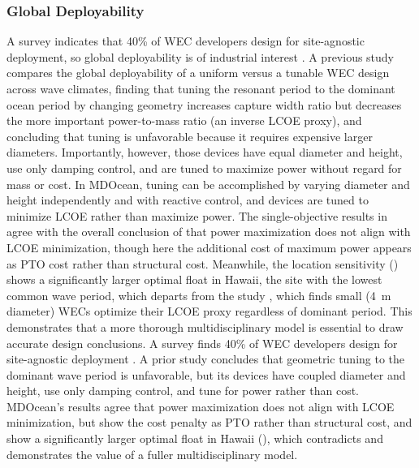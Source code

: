 \subsubsection{Global Deployability}
\ifdefined\DISSERTATION
    A survey indicates that 40\% of WEC developers design for site-agnostic deployment, so global deployability is of industrial interest \cite{trueworthy_wave_2020}.
    A previous study \cite{de_andres_adaptability_2015} compares the global deployability of a uniform versus a tunable WEC design across wave climates, finding that tuning the resonant period to the dominant ocean period by changing geometry increases capture width ratio but decreases the more important power-to-mass ratio (an inverse LCOE proxy), and concluding that tuning is unfavorable because it requires expensive larger diameters.
    Importantly, however, those devices have equal diameter and height, use only damping control, and are tuned to maximize power without regard for mass or cost.
    In MDOcean, tuning can be accomplished by varying diameter and height independently and with reactive control, and devices are tuned to minimize LCOE rather than maximize power.
    The single-objective results in  agree with the overall conclusion of \cite{de_andres_adaptability_2015} that power maximization does not align with LCOE minimization, though here the additional cost of maximum power appears as PTO cost rather than structural cost.
    Meanwhile, the location sensitivity () shows a significantly larger optimal float in Hawaii, the site with the lowest common wave period, which departs from the study \cite{de_andres_adaptability_2015}, which finds small (4~m diameter) WECs optimize their LCOE proxy regardless of dominant period.
    This demonstrates that a more thorough multidisciplinary model is essential to draw accurate design conclusions.
\else
    A survey finds 40\% of WEC developers design for site-agnostic deployment \cite{trueworthy_wave_2020}.
    A prior study \cite{de_andres_adaptability_2015} concludes that geometric tuning to the dominant wave period is unfavorable, but its devices have coupled diameter and height, use only damping control, and tune for power rather than cost.
    MDOcean's results agree that power maximization does not align with LCOE minimization, but show the cost penalty as PTO rather than structural cost, and show a significantly larger optimal float in Hawaii (), which contradicts \citet{de_andres_adaptability_2015} and demonstrates the value of a fuller multidisciplinary model.
\fi

